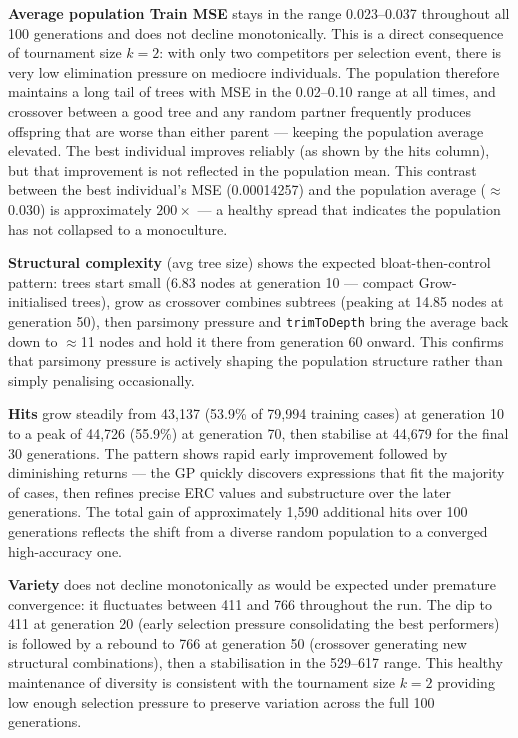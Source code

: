 \documentclass[12pt,a4paper]{article}
\begin{document}
\textbf{Average population Train MSE} stays in the range 0.023--0.037 throughout all 100 generations and does not decline monotonically. This is a direct consequence of tournament size $k = 2$: with only two competitors per selection event, there is very low elimination pressure on mediocre individuals. The population therefore maintains a long tail of trees with MSE in the 0.02--0.10 range at all times, and crossover between a good tree and any random partner frequently produces offspring that are worse than either parent --- keeping the population average elevated. The best individual improves reliably (as shown by the hits column), but that improvement is not reflected in the population mean. This contrast between the best individual's MSE (0.00014257) and the population average ($\approx$0.030) is approximately $200\times$ --- a healthy spread that indicates the population has not collapsed to a monoculture.

\textbf{Structural complexity} (avg tree size) shows the expected bloat-then-control pattern: trees start small (6.83 nodes at generation 10 --- compact Grow-initialised trees), grow as crossover combines subtrees (peaking at 14.85 nodes at generation 50), then parsimony pressure and \texttt{trimToDepth} bring the average back down to $\approx$11 nodes and hold it there from generation 60 onward. This confirms that parsimony pressure is actively shaping the population structure rather than simply penalising occasionally.

\textbf{Hits} grow steadily from 43,137 (53.9\% of 79,994 training cases) at generation 10 to a peak of 44,726 (55.9\%) at generation 70, then stabilise at 44,679 for the final 30 generations. The pattern shows rapid early improvement followed by diminishing returns --- the GP quickly discovers expressions that fit the majority of cases, then refines precise ERC values and substructure over the later generations. The total gain of approximately 1,590 additional hits over 100 generations reflects the shift from a diverse random population to a converged high-accuracy one.

\textbf{Variety} does not decline monotonically as would be expected under premature convergence: it fluctuates between 411 and 766 throughout the run. The dip to 411 at generation 20 (early selection pressure consolidating the best performers) is followed by a rebound to 766 at generation 50 (crossover generating new structural combinations), then a stabilisation in the 529--617 range. This healthy maintenance of diversity is consistent with the tournament size $k = 2$ providing low enough selection pressure to preserve variation across the full 100 generations.
\end{document}

